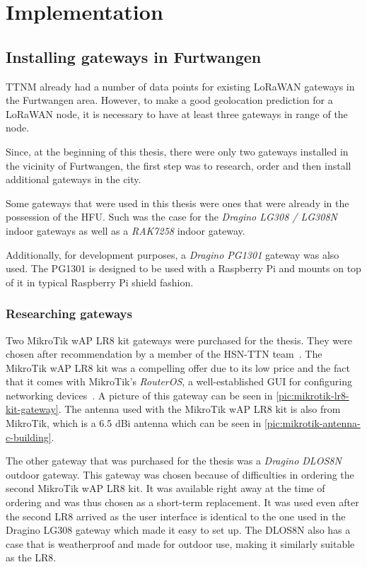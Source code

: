 \chapter{Implementation}

\section{Installing gateways in Furtwangen}

\ac{TTNM} already had a number of data points for existing \ac{LoRaWAN} gateways in the Furtwangen area.
However, to make a good geolocation prediction for a \ac{LoRaWAN} node, it is necessary to have at least three gateways in range of the node.

Since, at the beginning of this thesis, there were only two gateways installed in the vicinity of Furtwangen, the first step was to research, order and then install additional gateways in the city.

Some gateways that were used in this thesis were ones that were already in the possession of the \ac{HFU}.
Such was the case for the \emph{Dragino LG308 / LG308N} indoor gateways as well as a \emph{RAK7258} indoor gateway.

Additionally, for development purposes, a \emph{Dragino PG1301} gateway was also used.
The PG1301 is designed to be used with a Raspberry Pi and mounts on top of it in typical Raspberry Pi shield fashion.

\subsection{Researching gateways}

Two MikroTik wAP LR8 kit gateways were purchased for the thesis.
They were chosen after recommendation by a member of the \ac{HSN-TTN} team~\cite{hochschwarzwald_smart_net_-_thethingsnetwork_eingesetzte_nodate}.
The MikroTik wAP LR8 kit was a compelling offer due to its low price and the fact that it comes with MikroTik's \emph{RouterOS}, a well-established GUI for configuring networking devices~\cite{mikrotik_mikrotik_nodate}.
A picture of this gateway can be seen in \cref{pic:mikrotik-lr8-kit-gateway}.
The antenna used with the MikroTik wAP LR8 kit is also from MikroTik, which is a 6.5 dBi antenna which can be seen in \cref{pic:mikrotik-antenna-c-building}.

The other gateway that was purchased for the thesis was a \emph{Dragino DLOS8N} outdoor gateway.
This gateway was chosen because of difficulties in ordering the second MikroTik wAP LR8 kit.
It was available right away at the time of ordering and was thus chosen as a short-term replacement.
It was used even after the second LR8 arrived as the user interface is identical to the one used in the Dragino LG308 gateway which made it easy to set up.
The DLOS8N also has a case that is weatherproof and made for outdoor use, making it similarly suitable as the LR8.

